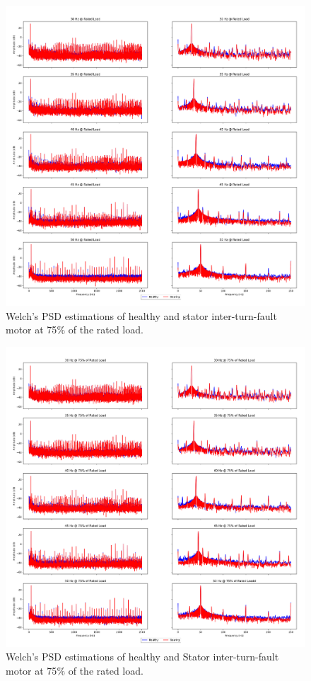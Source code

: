 \pagebreak
\begin{figure}[p]
	\centering
	\includegraphics[width=0.75\paperwidth,keepaspectratio=true]{./fig/psdstator_100.png}
	\caption{Welch's PSD estimations of healthy and stator inter-turn-fault motor at 75$\%$ of the rated load.}	
	\label{psdstator100}
\end{figure}
\pagebreak
\begin{figure}[p]
	\centering
	\includegraphics[width=0.75\paperwidth,keepaspectratio=true]{./fig/psdstator_75.png}
	\caption{Welch's PSD estimations of healthy and Stator inter-turn-fault motor at 75$\%$ of the rated load.}	
	\label{psdstator75}
\end{figure}
